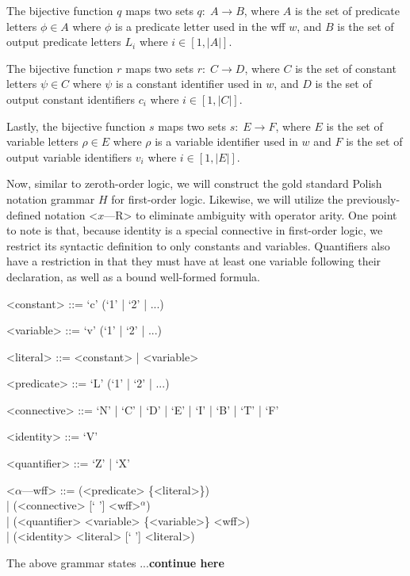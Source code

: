 \documentclass[ms]{uncgdissertationexp2}
\theoremstyle{plain}
\theoremstyle{definition}
\theoremstyle{remark}
\begin{document}
The bijective function $q$ maps two sets $q:\;A \to B$, where $A$ is the set of predicate letters $\phi \in A$ where $\phi$ is a predicate letter used in the wff $w$, and $B$ is the set of output predicate letters $L_{i}$ where $i \in [1, |A|]$.

The bijective function $r$ maps two sets $r:\;C \to D$, where $C$ is the set of constant letters $\psi \in C$ where $\psi$ is a constant identifier used in $w$, and $D$ is the set of output constant identifiers $c_{i}$ where $i \in [1, |C|]$.

Lastly, the bijective function $s$ maps two sets $s:\;E \to F$, where $E$ is the set of variable letters $\rho \in E$ where $\rho$ is a variable identifier used in $w$ and $F$ is the set of output variable identifiers $v_{i}$ where $i \in [1, |E|]$.

Now, similar to zeroth-order logic, we will construct the gold standard Polish notation grammar $H$ for first-order logic. Likewise, we will utilize the previously-defined notation \textless{$x$---R\textgreater} to eliminate ambiguity with operator arity. One point to note is that, because identity is a special connective in first-order logic, we restrict its syntactic definition to only constants and variables. Quantifiers also have a restriction in that they must have at least one variable following their declaration, as well as a bound well-formed formula.
\begin{grammar}

    <constant> ::= `c' (`1' | `2' | ...)

    <variable> ::= `v' (`1' | `2' | ...)

    <literal> ::= <constant> | <variable>

    <predicate> ::= `L' (`1' | `2' | ...)

    <connective> ::= `N' | `C' | `D' | `E' | `I' | `B' | `T' | `F'

    <identity> ::= `V'

    <quantifier> ::= `Z' | `X'

    <$\alpha$---wff> ::= (<predicate> \{<literal>\}) \\| (<connective> [` '] <wff>$^{\alpha}$) \\| (<quantifier> <variable> \{<variable>\} <wff>)\\| (<identity> <literal> [` '] <literal>)
\end{grammar}
The above grammar states ...\textbf{continue here}
\end{document}
